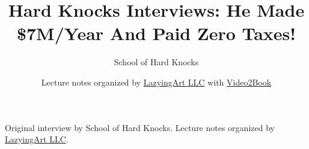 \documentclass[11pt,oneside]{book}
\begin{document}
\frontmatter
\title{Hard Knocks Interviews: He Made \$7M/Year And Paid Zero Taxes!}
\author{School of Hard Knocks}
\date{Lecture notes organized by \href{https://lazying.art}{LazyingArt LLC} with \href{https://github.com/lachlanchen/Video2Book}{Video2Book}}
\maketitle
\begin{center}
\small Original interview by School of Hard Knocks. Lecture notes organized by \href{https://lazying.art}{LazyingArt LLC}.
\end{center}
\clearpage
\mainmatter

\end{document}
